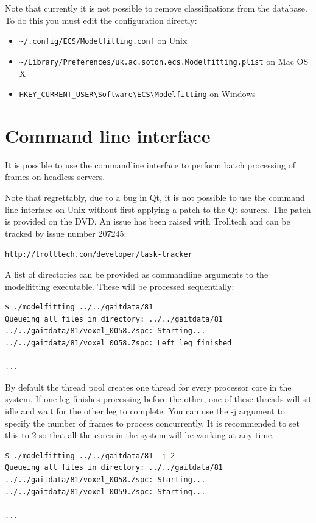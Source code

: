 Note that currently it is not possible to remove classifications from the database.
To do this you must edit the configuration directly:

\begin{itemize}
	\item \verb+~/.config/ECS/Modelfitting.conf+ on Unix
	\item \verb+~/Library/Preferences/uk.ac.soton.ecs.Modelfitting.plist+ on Mac OS X
	\item \verb+HKEY_CURRENT_USER\Software\ECS\Modelfitting+ on Windows
\end{itemize}


\clearpage
\section{Command line interface}
\label{manual:commandline}

It is possible to use the commandline interface to perform batch processing of frames on headless servers.

Note that regrettably, due to a bug in Qt, it is not possible to use the command line interface on Unix without first applying a patch to the Qt sources.
The patch is provided on the DVD.
An issue has been raised with Trolltech and can be tracked by issue number 207245:

\verb+http://trolltech.com/developer/task-tracker+

\bigskip
\noindent A list of directories can be provided as commandline arguments to the modelfitting executable.
These will be processed sequentially:

\begin{lstlisting}[firstnumber=1,language=sh,frame=single]
$ ./modelfitting ../../gaitdata/81
Queueing all files in directory: ../../gaitdata/81
../../gaitdata/81/voxel_0058.Zspc: Starting...
../../gaitdata/81/voxel_0058.Zspc: Left leg finished

...
\end{lstlisting}

By default the thread pool creates one thread for every processor core in the system.
If one leg finishes processing before the other, one of these threads will sit idle and wait for the other leg to complete.
You can use the -j argument to specify the number of frames to process concurrently.
It is recommended to set this to 2 so that all the cores in the system will be working at any time.

\begin{lstlisting}[firstnumber=1,language=sh,frame=single]
$ ./modelfitting ../../gaitdata/81 -j 2
Queueing all files in directory: ../../gaitdata/81
../../gaitdata/81/voxel_0058.Zspc: Starting...
../../gaitdata/81/voxel_0059.Zspc: Starting...

...
\end{lstlisting}
